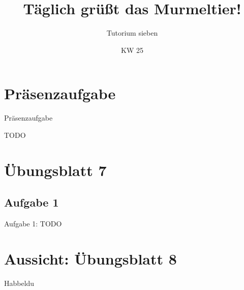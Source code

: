 \relax\relax

\iffull
\title{Täglich grüßt das Murmeltier!} %
\subtitle{Tutorium sieben}
\date{KW 25}

\fi
{}

\iffull
\titleframe

\fi

\fi

\section{Präsenzaufgabe}
{\taskenum
\begin{frame}[fragile,c]{Präsenzaufgabe}
\begin{aufgabe}{TODO}
\end{aufgabe}
\end{frame}
}

\section{Übungsblatt 7}
\subsection{Aufgabe 1}
{\taskenum
\begin{frame}[c]{Aufgabe 1: TODO}
\end{frame}
}

\iffull
{}
\section{Aussicht: Übungsblatt 8}
\begin{frame}{Habbeldu}
\end{frame}
\fi

